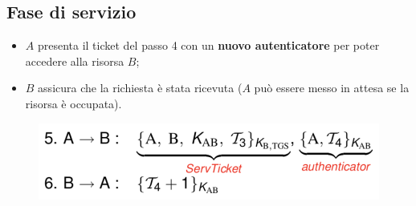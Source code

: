 \documentclass[11pt, a4paper, twoside, italian]{report}
\theoremstyle{plain}
\begin{document}
\subsection*{Fase di servizio}
\begin{multicols}{2}
	\begin{itemize}
		\item $A$ presenta il ticket del passo 4 con un \textbf{nuovo autenticatore} per poter accedere alla risorsa $B$;
		\item $B$ assicura che la richiesta è stata ricevuta ($A$ può essere messo in attesa se la risorsa è occupata).
	\end{itemize}
\columnbreak
	\begin{figure}[H]
		\centering
		\includegraphics[scale=0.6]{kerbservicephase}
	\end{figure}
\end{multicols}
\end{document}

